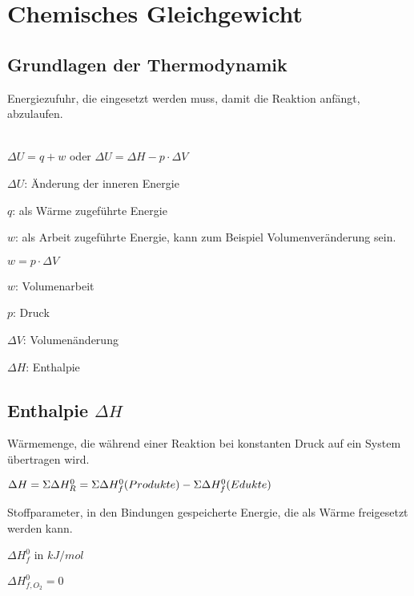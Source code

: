 \section{Chemisches Gleichgewicht}

\subsection{Grundlagen der Thermodynamik}

\begin{definition}[Aktivierungsenergie]
	Energiezufuhr, die eingesetzt werden muss, damit die Reaktion anfängt, abzulaufen.
\end{definition}

\begin{definition}
	\leavevmode \\
	$\Delta U = q+w$ oder $\Delta U = \Delta H - p \cdot \Delta V$
	
	$\Delta U$: Änderung der inneren Energie
	
	$q$: als Wärme zugeführte Energie
	
	$w$: als Arbeit zugeführte Energie, kann zum Beispiel Volumenveränderung sein.

\end{definition}

\begin{definition}[Volumenarbeit]
	$w = p \cdot \Delta V$
	
	$w$: Volumenarbeit
	
	$p$: Druck
	
	$\Delta V$: Volumenänderung
	
	$\Delta H$: Enthalpie
	
\end{definition}

\subsection{Enthalpie $\Delta H$}

Wärmemenge, die während einer Reaktion bei konstanten Druck auf ein System übertragen wird.
	
{\large
	$\Delta H = \\ \Sigma \Delta H^0_R = \Sigma \Delta H^0_f (Produkte) - \Sigma \Delta H^0_f (Edukte)$
}

\begin{definition}[Standardbildungsenthalpie]
	Stoffparameter, in den Bindungen gespeicherte Energie, die als Wärme freigesetzt werden kann.
	
	$\Delta H^0_f$ in $kJ/mol$
	
	\begin{note}
		$\Delta H^0_{f,O_2} = 0$
	\end{note}

\end{definition}


